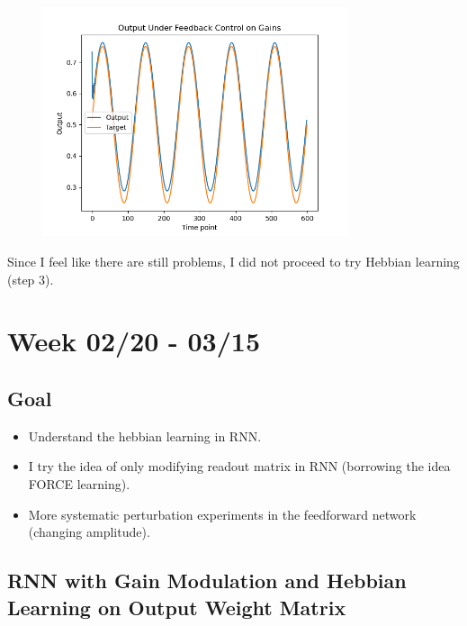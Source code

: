 \documentclass[12pt, a4paper]{article}
\begin{document}
\begin{figure}[H]
    \centering
    \includegraphics[width=0.8\textwidth]{RNN/FORCE/fig/FORCE_tracking_output.png} \\
\end{figure}

Since I feel like there are still problems, I did not proceed to try Hebbian learning (step 3). 

\newpage


\section*{Week 02/20 - 03/15}

\subsection*{Goal}

\noindent
\begin{itemize}
    \item Understand the hebbian learning in RNN.
    \item I try the idea of only modifying readout matrix in RNN (borrowing the idea FORCE learning).
    \item More systematic perturbation experiments in the feedforward network (changing amplitude).

\end{itemize}

\newpage

\subsection*{RNN with Gain Modulation and Hebbian Learning on Output Weight Matrix}
\end{document}
